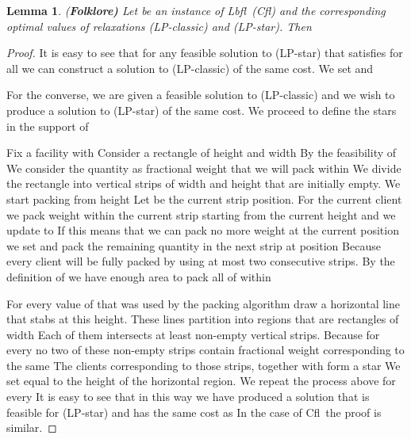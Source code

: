 \documentclass[11pt]{article}\usepackage{amsmath}
\newtheorem{lemma}{Lemma}[section]
\newcommand{\lbfl}{{\sc Lbfl}}
\newcommand{\cfl}{{\sc Cfl}}
\begin{document}
\begin{lemma} {(\bf Folklore)}  \label{lemma:ap-classic}
Let  be an instance of \lbfl\ (\cfl\/) and  the
corresponding optimal values of 
relaxations (LP-classic) and (LP-star). Then 
\end{lemma}
\begin{proof}
It is easy to see that for any feasible solution to (LP-star) that
satisfies   for all  we can 
construct a solution to (LP-classic) of the same cost. We set   and  


For the converse, we are given a feasible solution  to
(LP-classic) and we wish to produce a solution  to (LP-star) of
the same cost.  We proceed to define the stars in the support of  

Fix a facility  with  Consider  a rectangle  of height 
 and width  By the
feasibility of    We consider  the quantity
 as fractional weight that we will pack 
within  
We divide the rectangle  into  vertical strips of width 
and height  that are initially
empty.  
We
start packing from height  Let  be the
current strip position. For the current client
 we pack weight within the current strip   starting from the current height
 and we
update  to   If 
 this means that we can pack  no more weight   at the
current position  we set  and pack the remaining quantity  in the next strip at position  Because  every client  will be fully packed by using at most 
two 
consecutive strips. By  the definition of  we have enough
area to pack all of  within  

For every value of  that was used by the packing algorithm   draw a horizontal
line that stabs  at this height. These lines partition   into
regions that are rectangles of width  
 Each of them intersects at least  non-empty vertical strips. Because for every   no two of 
these non-empty strips contain fractional weight corresponding to the  same  The clients
corresponding to  those strips, together with  form a star  We
set  equal to the height of the horizontal region. 
We repeat the process above for every  
It is easy
to see that in this way we have produced a solution  that is
feasible  for (LP-star) and has the  same cost as  
In the case of \cfl\ the proof is similar.
\end{proof} 
\end{document}
